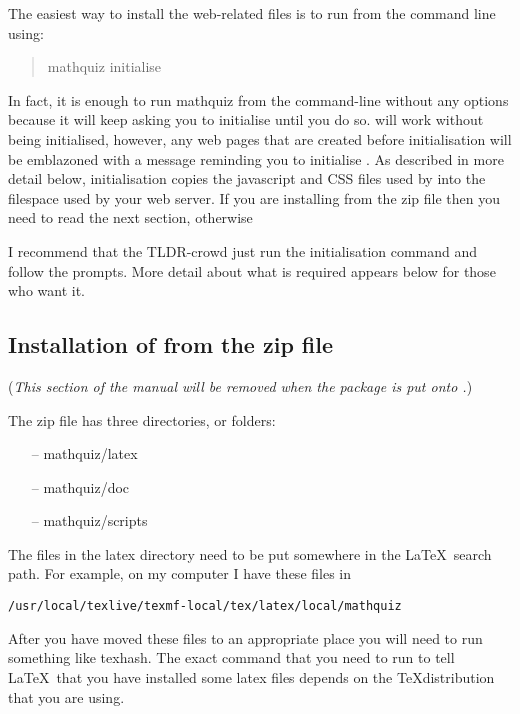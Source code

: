 \documentclass[svgnames]{article}
\newif\ifCtan\Ctanfalse %
\newcommand\ddash{\texttt{\textemdash\textemdash}}
\newcommand\mathquizopt[1]{\textsf{mathquiz \ddash#1}}
\begin{document}
    The easiest way to install the web-related files is to run \MathQuiz
    from the command line using:
    \begin{quote}
      \mathquizopt{initialise}
    \end{quote}
    In fact, it is enough to run \textsf{mathquiz} from the command-line
    without any options because it will keep asking you to initialise
    until you do so. \MathQuiz will work without being initialised,
    however, any web pages that are created before initialisation will
    be emblazoned with a message reminding you to initialise \MathQuiz.
    As described in more detail below, initialisation copies the
    javascript and CSS files used by \MathQuiz into the filespace used
    by your web server.
    \ifCtan\else If you are installing \MathQuiz from the zip file then
    you need to read the next section, otherwise
    \fi

    I recommend that the TLDR-crowd just run the initialisation command
    and follow the prompts. More detail about what is required appears
    below for those who want it.

    \ifCtan\else

    \subsection{Installation of \MathQuiz from the zip file}

    (\textit{This section of the manual will be removed when the
    package is put onto .})

      The \MathQuiz zip file has three directories, or folders:

      \begin{itemize}
        \item[--] mathquiz/latex
        \item[--] mathquiz/doc
        \item[--] mathquiz/scripts
      \end{itemize}

      The files in the \textsf{latex} directory need to be put somewhere in the \LaTeX\
    search path. For example, on my computer I have these files in
    \begin{center}
       \Verb|/usr/local/texlive/texmf-local/tex/latex/local/mathquiz|
    \end{center}
    After you have moved these files to an appropriate place you will need to run
    something like texhash. The exact command that you need to run to
    tell \LaTeX\ that you have installed some latex files depends on the
    \TeX distribution that you are using.
\end{document}
